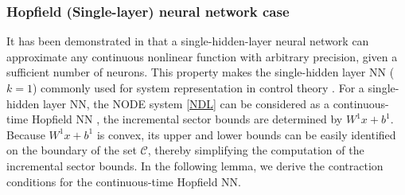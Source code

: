 \documentclass[journal,twoside,web]{ieeecolor}
\begin{document}
\subsubsection{‌Hopfield (Single-layer) neural network case} 
It has been demonstrated in \cite{lu2021learning} that a single-hidden-layer neural network can approximate any continuous nonlinear function with arbitrary precision, given a sufficient number of neurons. This property makes the
single-hidden layer NN ($k=1$) commonly used for system representation in control theory \cite{d2023incremental,kamalapurkar2016model,samanipour2023stability}. %
For a single-hidden layer NN, the NODE system \eqref{NDL} can be considered as a continuous-time Hopfield NN \cite{davydov2024non}, the incremental sector bounds are determined by $W^1x + b^1$. Because $W^1x + b^1$ is convex, its upper and lower bounds can be easily identified on the boundary of the set $\mathcal{C}$, thereby simplifying the computation of the incremental sector bounds. In the following lemma, we derive the contraction conditions for the continuous-time Hopfield NN.
\end{document}
